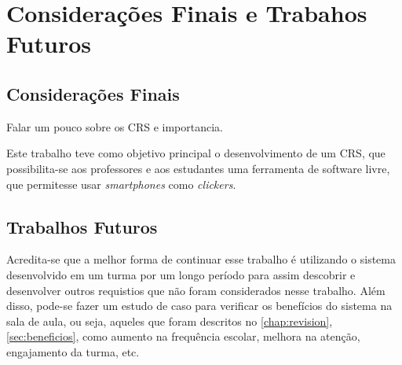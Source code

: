 \chapter{Considerações Finais e Trabahos Futuros}

\section{Considerações Finais}

Falar um pouco sobre os CRS e importancia.

Este trabalho teve como objetivo principal o desenvolvimento de um CRS,
que possibilita-se aos professores e aos estudantes uma ferramenta de software livre,
que permitesse usar {\textit{smartphones}} como \textit{clickers}.



\section{Trabalhos Futuros}

Acredita-se que a melhor forma de continuar esse trabalho é utilizando o sistema
desenvolvido em um turma por um longo período para assim descobrir e desenvolver outros requistios que não
foram considerados nesse trabalho. Além disso, pode-se fazer um estudo de caso para verificar os benefícios
do sistema na sala de aula, ou seja, aqueles que foram descritos no \autoref{chap:revision}, \autoref{sec:beneficios},
como aumento na frequência escolar, melhora na atenção, engajamento da turma, etc.
